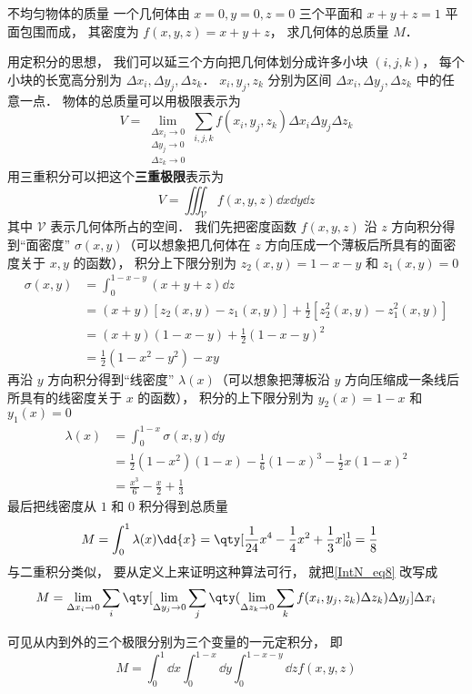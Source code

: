 \begin{exam}{不均匀物体的质量}
一个几何体由 $x = 0, y = 0, z = 0$ 三个平面和 $x + y + z = 1$ 平面包围而成， 其密度为 $f(x,y,z) = x + y + z$， 求几何体的总质量 $M$．

用定积分的思想， 我们可以延三个方向把几何体划分成许多小块 $(i,j,k)$， 每个小块的长宽高分别为 $\Delta x_i, \Delta y_j, \Delta z_k$． $x_i, y_j, z_k$ 分别为区间 $\Delta x_i, \Delta y_j, \Delta z_k$ 中的任意一点． 物体的总质量可以用极限表示为
\begin{equation}\label{IntN_eq8}
V = \lim_{\substack{\Delta x_i\to 0\\ \Delta y_j\to 0\\ \Delta z_k\to 0}} \sum_{i, j, k} f(x_i,y_j,z_k) \Delta x_i \Delta y_j \Delta z_k
\end{equation}
用三重积分可以把这个\textbf{三重极限}表示为
\begin{equation}
V = \iiint_{\mathcal{V}} f(x,y,z) \dd{x}\dd{y}\dd{z}
\end{equation}
其中 $\mathcal{V}$ 表示几何体所占的空间． 我们先把密度函数 $f(x,y,z)$ 沿 $z$ 方向积分得到“面密度” $\sigma(x,y)$（可以想象把几何体在 $z$ 方向压成一个薄板后所具有的面密度关于 $x,y$ 的函数）， 积分上下限分别为 $z_2(x,y) = 1 -x - y$ 和 $z_1(x,y) = 0$
\begin{equation}\begin{aligned}
\sigma(x,y) &= \int_{0}^{1-x-y} (x+y+z) \dd{z} \\
&= (x + y)[z_2(x,y) - z_1(x,y)] + \frac 12 [z_2^2(x,y) - z_1^2(x,y)]\\
&= (x + y)(1-x-y) + \frac 12 (1-x-y)^2\\
&= \frac 12 (1 - x^2 - y^2) - xy
\end{aligned}\end{equation}
再沿 $y$ 方向积分得到“线密度” $\lambda(x)$（可以想象把薄板沿 $y$ 方向压缩成一条线后所具有的线密度关于 $x$ 的函数）， 积分的上下限分别为 $y_2(x) = 1-x$ 和 $y_1(x) = 0$
\begin{equation}\begin{aligned}
\lambda(x) &= \int_{0}^{1-x} \sigma(x,y) \dd{y} \\
&= \frac 12 (1-x^2) (1-x) - \frac 16 (1-x)^3 - \frac 12 x(1-x)^2\\
&= \frac{x^3}{6} - \frac{x}{2} + \frac 13
\end{aligned}\end{equation}
最后把线密度从 $1$ 和 $0$ 积分得到总质量
\begin{equation}\begin{aligned}
M &= \int_{0}^{1} \lambda(x) \dd{x} = \qty[\frac{1}{24} x^4 - \frac 14 x^2 + \frac 13 x]_0^1 = \frac 18
\end{aligned}\end{equation}
与二重积分类似， 要从定义上来证明这种算法可行， 就把\autoref{IntN_eq8} 改写成
\begin{equation}
M = \lim_{\Delta x_i\to 0} \sum_{i} \qty[\lim_{\Delta y_j\to 0}\sum_{j} \qty( \lim_{\Delta z_k\to 0} \sum_{k} f(x_i,y_j,z_k) \Delta z_k )\Delta y_j ] \Delta x_i
\end{equation}
\end{exam}
可见从内到外的三个极限分别为三个变量的一元定积分， 即
\begin{equation}
M = \int_{0}^{1} \dd{x} \int_{0}^{1-x} \dd{y}  \int_{0}^{1-x-y} \dd{z} f(x,y,z)
\end{equation}

